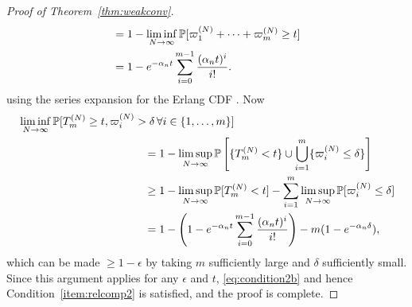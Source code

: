 \begin{proof}[Proof of Theorem~\ref{thm:weakconv}]
\begin{align*}
&= 1- \liminf_{N\to\infty} \mathbb{P}[ \varpi_1^{(N)} + \cdots + \varpi_m^{(N)} \geq t ] \\
&= 1- e^{-\alpha_n t} \sum_{i=0}^{m-1} \frac{(\alpha_n t)^i}{i!} .
\end{align*}
using the series expansion for the Erlang CDF \parencite[see for example][Chapter 15]{forbes2011}.
Now
\begin{align*}
&\liminf_{N\to\infty} 
        \Prob[ T_m^{(N)} \geq t, \varpi_i^{(N)} > \delta \,\forall i\in \{1,\dots,m\} ] \\
&\hspace{4cm}= 1 - \limsup_{N\to\infty} \Prob\left[ \{ T_m^{(N)} < t \} \cup
        \bigcup_{i=1}^m \{ \varpi_i^{(N)} \leq \delta \}  \right]\\
&\hspace{4cm}\geq 1 - \limsup_{N\to\infty} \Prob[ T_m^{(N)} < t ] 
        - \sum_{i=1}^m \limsup_{N\to\infty} \Prob[ \varpi_i^{(N)} \leq \delta]\\
&\hspace{4cm}= 1- \left( 1- e^{-\alpha_n t} \sum_{i=0}^{m-1} 
        \frac{(\alpha_n t)^i}{i!} \right) - m( 1- e^{-\alpha_n \delta} ) ,
\end{align*}
which can be made $\geq 1-\epsilon$ by taking $m$ sufficiently large and $\delta$ sufficiently small.
Since this argument applies for any $\epsilon$ and $t$, \eqref{eq:condition2b} and hence Condition~\ref{item:relcomp2} is satisfied, and the proof is complete.

\end{proof}
